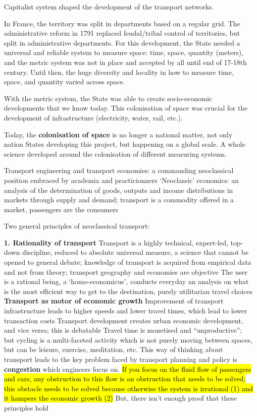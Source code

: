 \documentclass{article}
\begin{document}
Capitalist system shaped the development of the transport networks.

In France, the territory was split in departments based on a regular grid. The administrative reform in 1791 replaced feudal/tribal control of territories, but split in administrative departments. For this development, the State needed a universal and reliable system to measure space: time, space, quantity (meters), and the metric system was not in place and accepted by all until end of 17-18th century. Until then, the huge diversity and locality in how to measure time, space, and quantity varied across space.

With the metric system, the State was able to create socio-economic developments that we know today. This colonisation of space was crucial for the development of infrastructure (electricity, water, rail, etc.). 

Today, the \textbf{colonisation of space} is no longer a national matter, not only nation States developing this project, but happening on a global scale. A whole science developed around the colonisation of different measuring systems. 

\begin{outline}
	\1 Transport engineering and transport economies: a commanding neoclassical position embraced by academia and practicionners
	\1 `Neoclassic' economics: an analysis of the determination of goods, outputs and income distributions in markets through supply and demand; transport is a commodity offered in a market, passengers are the consumers
\end{outline}

Two general principles of neoclassical transport:

\begin{outline}
	\1 \textbf{1. Rationality of transport}
		\2 Transport is a highly technical, expert-led, top-down discipline, reduced to absolute universal measure, a science that cannot be opened to general debate; knowledge of transport is acquired from empirical data and not from theory; transport geography and economies are objective
		\2 The user is a rational being, a `homo-economicus', conducts everyday an analysis on what is the most efficient way to get to the destination, purely utilitarian travel choices
	\1 \textbf{Transport as motor of economic growth}
		\2 Improvement of transport infrastructure leads to higher speeds and lower travel times, which lead to lower transaction costs
		\2 Transport development creates urban economic development, and vice versa; this is debatable
		\2 Travel time is monetised and ``unproductive''; but cycling is a multi-faceted activity which is not purely moving between spaces, but can be leisure, exercise, meditation, etc. 
		\2 This way of thinking about transport leads to the key problem faced by transport planning and policy is \textbf{congestion} which engineers focus on. \hl{If you focus on the fluid flow of passengers and cars, any obstruction to this flow is an obstruction that needs to be solved; this obstacle needs to be solved because otherwise the system is irrational (1) and it hampers the economic growth (2)}
	\1 But, there isn't enough proof that these principles hold
\end{outline}
\end{document}
